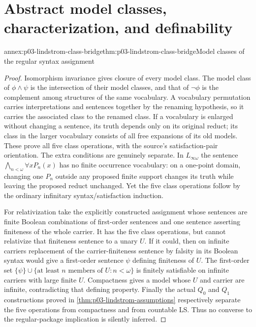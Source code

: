 \section{Abstract model classes, characterization, and definability}

\begin{annexitem}{annex:p03-lindstrom-class-bridge}{thm:p03-lindstrom-class-bridge}{Model classes of the regular syntax assignment}
\begin{proof}
Isomorphism invariance gives closure of every model class. The model class
of \(\phi\land\psi\) is the intersection of their model classes, and
that of \(\neg\phi\) is the complement among structures of the same
vocabulary. A vocabulary permutation carries interpretations and sentences
together by the renaming hypothesis, so it carries the associated class to
the renamed class. If a vocabulary is enlarged without changing a sentence,
its truth depends only on its original reduct; its class in the larger
vocabulary consists of all free expansions of its old models. These prove
all five class operations, with the source's satisfaction-pair orientation.
The extra conditions are genuinely separate. In \(L_{\infty\omega}\)
the sentence \(\bigwedge_{n<\omega}\forall xP_n(x)\) has no finite
occurrence vocabulary: on a one-point domain, changing one \(P_n\)
outside any proposed finite support changes its truth while leaving the
proposed reduct unchanged. Yet the five class operations follow by the
ordinary infinitary syntax/satisfaction induction.

For relativization take the explicitly constructed assignment whose
sentences are finite Boolean combinations of first-order sentences and
one sentence asserting finiteness of the whole carrier. It has the five
class operations, but cannot relativize that finiteness sentence to a
unary \(U\). If it could, then on infinite carriers replacement of the
carrier-finiteness sentence by falsity in its Boolean syntax would give
a first-order sentence \(\psi\) defining finiteness of \(U\).
The first-order set \(\{\psi\}\cup\{\text{at least }n\text{ members
of }U:n<\omega\}\) is finitely satisfiable on infinite carriers with
large finite \(U\). Compactness gives a model whose \(U\) and carrier
are infinite, contradicting that defining property. Finally the actual
\(Q_0\) and \(Q_1\) constructions proved in
\cref{thm:p03-lindstrom-assumptions} respectively separate the five
operations from compactness and from countable LS. Thus no converse to
the regular-package implication is silently inferred.
\end{proof}
\end{annexitem}


